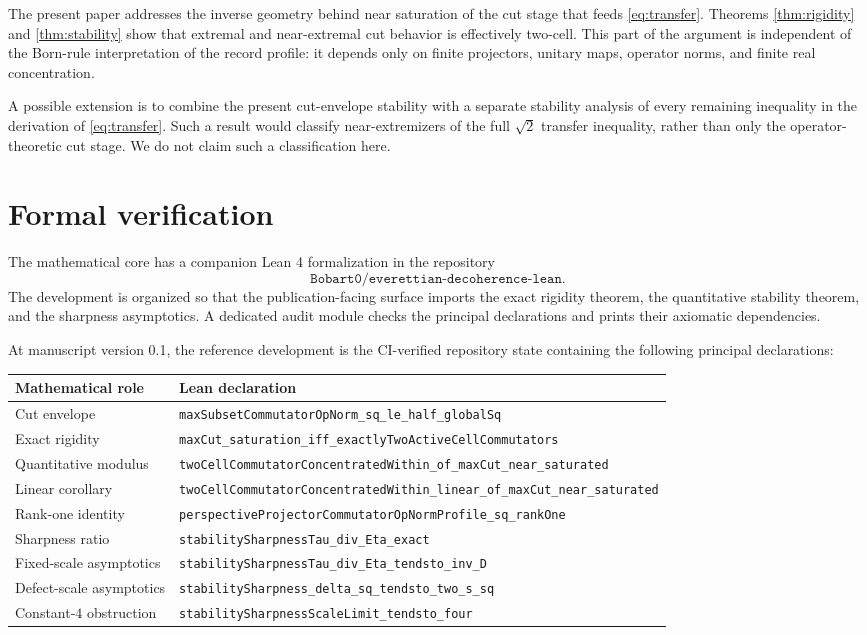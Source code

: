 \documentclass[11pt]{article}
\begin{document}
The present paper addresses the inverse geometry behind near saturation of
the cut stage that feeds \eqref{eq:transfer}.  Theorems
\ref{thm:rigidity} and \ref{thm:stability} show that extremal and
near-extremal cut behavior is effectively two-cell.  This part of the
argument is independent of the Born-rule interpretation of the record
profile: it depends only on finite projectors, unitary maps, operator norms,
and finite real concentration.

A possible extension is to combine the present cut-envelope stability with a
separate stability analysis of every remaining inequality in the derivation
of \eqref{eq:transfer}.  Such a result would classify near-extremizers of the
full $\sqrt2$ transfer inequality, rather than only the operator-theoretic cut
stage.  We do not claim such a classification here.

\section{Formal verification}

The mathematical core has a companion Lean 4 formalization in the repository
\[
  \texttt{Bobart0/everettian-decoherence-lean}.
\]
The development is organized so that the publication-facing surface imports
the exact rigidity theorem, the quantitative stability theorem, and the
sharpness asymptotics.  A dedicated audit module checks the principal
declarations and prints their axiomatic dependencies.

At manuscript version 0.1, the reference development is the CI-verified
repository state containing the following principal declarations:
\begin{center}
\begin{tabular}{p{}p{}}
\hline
Mathematical role & Lean declaration\\
\hline
Cut envelope &
\texttt{maxSubsetCommutatorOpNorm\_sq\_le\_half\_globalSq}\\
Exact rigidity &
\texttt{maxCut\_saturation\_iff\_exactlyTwoActiveCellCommutators}\\
Quantitative modulus &
\texttt{twoCellCommutatorConcentratedWithin\_of\_maxCut\_near\_saturated}\\
Linear corollary &
\texttt{twoCellCommutatorConcentratedWithin\_linear\_of\_maxCut\_near\_saturated}\\
Rank-one identity &
\texttt{perspectiveProjectorCommutatorOpNormProfile\_sq\_rankOne}\\
Sharpness ratio &
\texttt{stabilitySharpnessTau\_div\_Eta\_exact}\\
Fixed-scale asymptotics &
\texttt{stabilitySharpnessTau\_div\_Eta\_tendsto\_inv\_D}\\
Defect-scale asymptotics &
\texttt{stabilitySharpness\_delta\_sq\_tendsto\_two\_s\_sq}\\
Constant-$4$ obstruction &
\texttt{stabilitySharpnessScaleLimit\_tendsto\_four}\\
\hline
\end{tabular}
\end{center}
\end{document}

